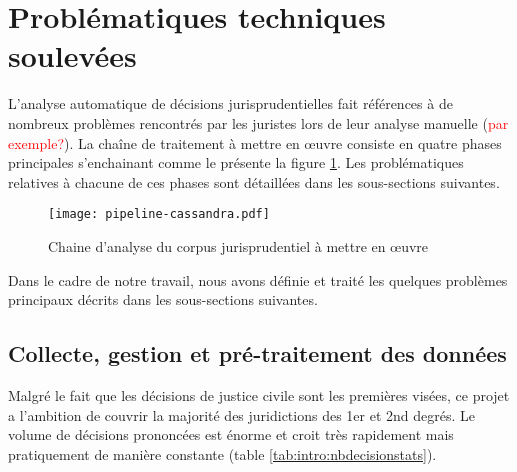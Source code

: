 \section{Problématiques techniques soulevées}
\label{sec:intro:probleme}
L'analyse automatique de décisions jurisprudentielles fait références à de nombreux problèmes rencontrés par les juristes lors de leur analyse manuelle (\textcolor{red}{par exemple?}). La chaîne de traitement à mettre en \oe uvre consiste en quatre phases principales s'enchainant comme le présente la figure \ref{fig:intro:pipeline-globale}. Les problématiques relatives à chacune de ces phases sont détaillées dans les sous-sections suivantes.
\begin{figure}[h]
\texttt{[image: pipeline-cassandra.pdf]}
\caption{Chaine d'analyse du corpus jurisprudentiel à mettre en \oe uvre} \label{fig:intro:pipeline-globale}
\end{figure} 

Dans le cadre de notre travail, nous avons définie et traité les quelques problèmes principaux décrits dans les sous-sections suivantes.

\subsection{Collecte, gestion et pré-traitement des données}

Malgré le fait que les décisions de justice civile sont les premières visées, ce projet a l'ambition de couvrir la majorité des juridictions des 1er et 2nd degrés. Le volume de décisions prononcées est énorme et croit très rapidement mais pratiquement de manière constante (table \ref{tab:intro:nbdecisionstats}).

